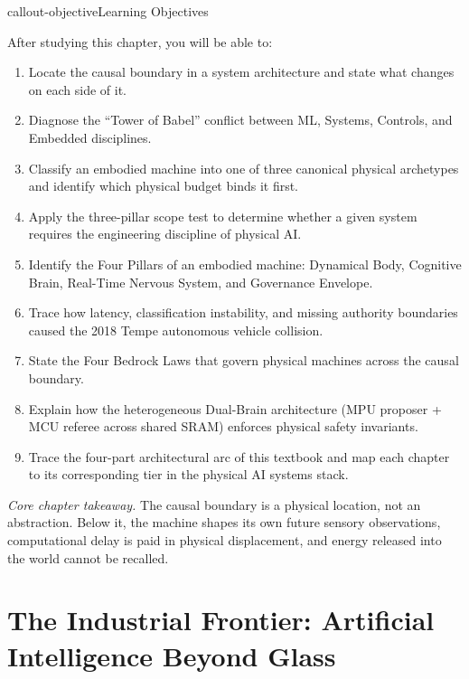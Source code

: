 \documentclass[
  10pt,
  letterpaper,
  twoside,
  openright,
  numbers=noenddot,
  headings=standardclasses
]{scrbook}
\begin{document}
\protect{}\label{callout-objectiveux2a-1.1}
\begin{fbxSimple}{callout-objective}{Learning Objectives}{}
\label{callout-objective*-1.1}

After studying this chapter, you will be able to:

\begin{enumerate}
\def\labelenumi{\arabic{enumi}.}
\tightlist
\item
  Locate the causal boundary in a system architecture and state what
  changes on each side of it.
\item
  Diagnose the ``Tower of Babel'' conflict between ML, Systems,
  Controls, and Embedded disciplines.
\item
  Classify an embodied machine into one of three canonical physical
  archetypes and identify which physical budget binds it first.
\item
  Apply the three-pillar scope test to determine whether a given system
  requires the engineering discipline of physical AI.
\item
  Identify the Four Pillars of an embodied machine: Dynamical Body,
  Cognitive Brain, Real-Time Nervous System, and Governance Envelope.
\item
  Trace how latency, classification instability, and missing authority
  boundaries caused the 2018 Tempe autonomous vehicle collision.
\item
  State the Four Bedrock Laws that govern physical machines across the
  causal boundary.
\item
  Explain how the heterogeneous Dual-Brain architecture (MPU proposer +
  MCU referee across shared SRAM) enforces physical safety invariants.
\item
  Trace the four-part architectural arc of this textbook and map each
  chapter to its corresponding tier in the physical AI systems stack.
\end{enumerate}

\emph{Core chapter takeaway.} The causal boundary is a physical
location, not an abstraction. Below it, the machine shapes its own
future sensory observations, computational delay is paid in physical
displacement, and energy released into the world cannot be recalled.

\end{fbxSimple}

\section{The Industrial Frontier: Artificial Intelligence Beyond
Glass}\label{sec-boundary-1-1}
\end{document}
